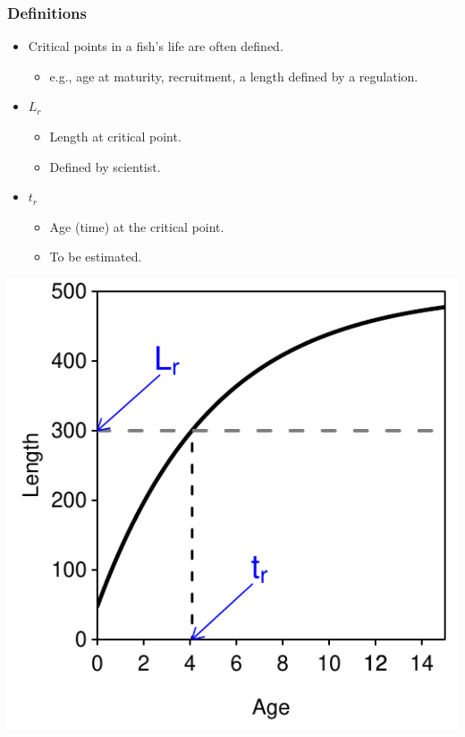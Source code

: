\documentclass[xcolor=dvipsnames]{beamer}\usepackage[]{graphicx}\usepackage[]{color}
\newenvironment{knitrout}{}{} %
\begin{document}
\begin{frame}[fragile, t]
\frametitle{Definitions}
\begin{itemize}
  \item Critical points in a fish's life are often defined.
  \begin{itemize}
    \item e.g., age at maturity, recruitment, a length defined by a regulation.
  \end{itemize}
\end{itemize}
\smallskip
\begin{minipage}[t]{0.6\textwidth}
  \begin{itemize}
    \item $L_{r}$
    \begin{itemize}
      \item Length at critical point.
      \item Defined by scientist.
    \end{itemize}
    \smallskip
    \item $t_{r}$
    \begin{itemize}
      \item Age (time) at the critical point.
      \item To be estimated.
    \end{itemize}
  \end{itemize}
\end{minipage}%
\hspace*{-2cm}
\begin{minipage}[t]{0.7\textwidth}
\begin{knitrout}\footnotesize
{}\color{fgcolor}

{\centering \includegraphics[width=.6\linewidth]{Figs/defn2-1} 

}



\end{knitrout}
\end{minipage}%
\end{frame}
\end{document}
